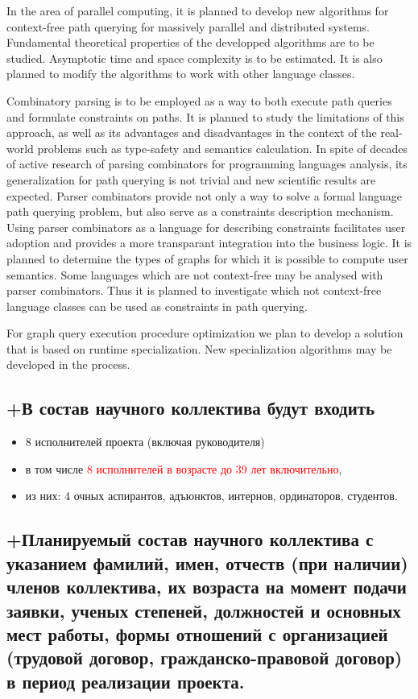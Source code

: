 \documentclass[12pt]{article}  %
\theoremstyle{remark}
\newcommand{\checkme}[1]{\textcolor{red}{#1}}
\begin{document}
In the area of parallel computing, it is planned to develop new algorithms for context-free path querying for massively parallel and distributed systems. Fundamental theoretical properties of the developped algorithms are to be studied. Asymptotic time and space complexity is to be estimated. It is also planned to modify the algorithms to work with other language classes.

Combinatory parsing is to be employed as a way to both execute path queries and formulate constraints on paths. It is planned to study the limitations of this approach, as well as its advantages and disadvantages in the context of the real-world problems such as type-safety and semantics calculation. In spite of decades of active research of parsing combinators for programming languages analysis, its generalization for path querying is not trivial and new scientific results are expected. Parser combinators provide not only a way to solve a formal language path querying problem, but also serve as a constraints description mechanism. Using parser combinators as a language for describing constraints facilitates user adoption and provides a more transparant integration into the business logic. It is planned to determine the types of graphs for which it is possible to compute user semantics. Some languages which are not context-free may be analysed with parser combinators. Thus it is planned to investigate which not context-free language classes can be used as constraints in path querying.

For graph query execution procedure optimization we plan to develop a solution that is based on runtime specialization. New specialization algorithms may be developed in the process.

\subsection{+В состав научного коллектива будут входить}
%
\begin{itemize}
\item 8 исполнителей проекта (включая руководителя)
\item в том числе \checkme{8  исполнителей в возрасте до 39 лет включительно},
\item из них: 4 очных аспирантов, адъюнктов, интернов, ординаторов, студентов.
\end{itemize}

\subsection{+Планируемый состав научного коллектива с указанием фамилий, имен, отчеств (при наличии) членов коллектива, их возраста на момент подачи заявки, ученых степеней, должностей и основных мест работы, формы отношений с организацией (трудовой договор, гражданско-правовой договор) в период реализации проекта.}
\end{document}
